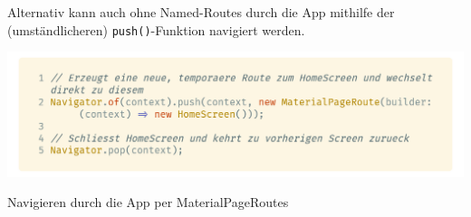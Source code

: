 Alternativ kann auch ohne Named-Routes durch die App mithilfe der (umständlicheren) \lstinline{push()}-Funktion navigiert 
werden.

\begin{code}
    \centering
    \includegraphics[width=1\textwidth]{images/Flutter/flutterAlternateNavigator.png}
    \vspace{-25pt}
    \caption{Navigieren durch die App per MaterialPageRoutes}
\end{code}